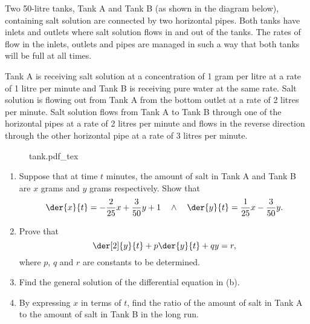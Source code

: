 \begin{problem}
    Two 50-litre tanks, Tank A and Tank B (as shown in the diagram below), containing salt solution are connected by two horizontal pipes. Both tanks have inlets and outlets where salt solution flows in and out of the tanks. The rates of flow in the inlets, outlets and pipes are managed in such a way that both tanks will be full at all times.

    Tank A is receiving salt solution at a concentration of 1 gram per litre at a rate of 1 litre per minute and Tank B is receiving pure water at the same rate. Salt solution is flowing out from Tank A from the bottom outlet at a rate of 2 litres per minute. Salt solution flows from Tank A to Tank B through one of the horizontal pipes at a rate of 2 litres per minute and flows in the reverse direction through the other horizontal pipe at a rate of 3 litres per minute.

    \begin{figure}[H]
        \centering
        {tank.pdf_tex}
    \end{figure}

    \begin{enumerate}
        \item Suppose that at time $t$ minutes, the amount of salt in Tank A and Tank B are $x$ grams and $y$ grams respectively. Show that \[\der{x}{t} = -\frac2{25} x + \frac3{50} y + 1 \quad \land \quad \der{y}{t} = \frac1{25} x - \frac3{50} y.\]
        \item Prove that \[\der[2]{y}{t} + p \der{y}{t} + qy = r,\] where $p$, $q$ and $r$ are constants to be determined.
        \item Find the general solution of the differential equation in (b).
        \item By expressing $x$ in terms of $t$, find the ratio of the amount of salt in Tank A to the amount of salt in Tank B in the long run.
    \end{enumerate}
\end{problem}

